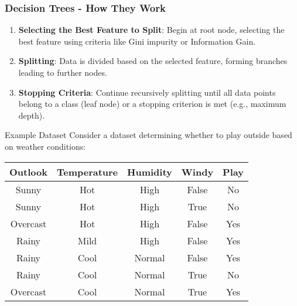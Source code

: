 \documentclass[aspectratio=169]{beamer}
\begin{document}
\begin{frame}[fragile]
    \frametitle{Decision Trees - How They Work}

    \begin{enumerate}
        \item \textbf{Selecting the Best Feature to Split}: Begin at root node, selecting the best feature using criteria like Gini impurity or Information Gain.
        \item \textbf{Splitting}: Data is divided based on the selected feature, forming branches leading to further nodes.
        \item \textbf{Stopping Criteria}: Continue recursively splitting until all data points belong to a class (leaf node) or a stopping criterion is met (e.g., maximum depth).
    \end{enumerate}

    \begin{block}{Example Dataset}
        Consider a dataset determining whether to play outside based on weather conditions:
        
        \begin{tabular}{|c|c|c|c|c|}
            \hline
            Outlook  & Temperature & Humidity & Windy & Play \\
            \hline
            Sunny    & Hot        & High     & False & No   \\
            Sunny    & Hot        & High     & True  & No   \\
            Overcast & Hot        & High     & False & Yes  \\
            Rainy    & Mild       & High     & False & Yes  \\
            Rainy    & Cool       & Normal   & False & Yes  \\
            Rainy    & Cool       & Normal   & True  & No   \\
            Overcast & Cool       & Normal   & True  & Yes  \\
            \hline
        \end{tabular}
    \end{block}
\end{frame}
\end{document}
